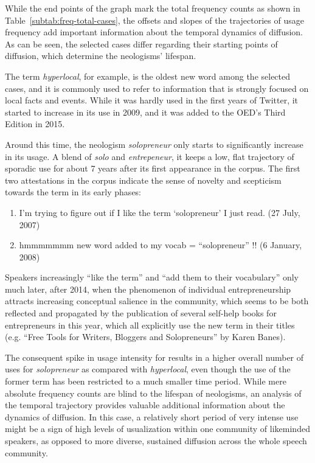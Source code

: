 \documentclass[
  a4paper,
  abstract=on,
  captions=tableabove
  ]{scrartcl}
\begin{document}
  While the end points of the graph mark the total frequency counts as shown in Table~\ref{subtab:freq-total-cases}, the offsets and slopes of the trajectories of usage frequency add important information about the temporal dynamics of diffusion. As can be seen, the selected cases differ regarding their starting points of diffusion, which determine the neologisms' lifespan.

    The term \emph{hyperlocal}, for example, is the oldest new word among the selected cases, and it is commonly used to refer to information that is strongly focused on local facts and events. While it was hardly used in the first years of Twitter, it started to increase in its use in 2009, and it was added to the OED's Third Edition in 2015.

    Around this time, the neologism \emph{solopreneur} only starts to significantly increase in its usage. A blend of \emph{solo} and \emph{entrepeneur}, it keeps a low, flat trajectory of sporadic use for about 7 years after its first appearance in the corpus. The first two attestations in the corpus indicate the sense of novelty and scepticism towards the term in its early phases:

    \renewcommand{\labelenumi}{(\arabic{enumi})}
    \begin{enumerate}
      \item I'm trying to figure out if I like the term `solopreneur' I just read. (27 July, 2007)
      \item hmmmmmmm new word added to my vocab = ``solopreneur'' !! (6 January, 2008)
    \end{enumerate}

    Speakers increasingly \enquote{like the term} and \enquote{add them to their vocabulary} only much later, after 2014, when the phenomenon of individual entrepreneurship attracts increasing conceptual salience in the community, which seems to be both reflected and propagated by the publication of several self-help books for entrepreneurs in this year, which all explicitly use the new term in their titles (e.g. \enquote{Free Tools for Writers, Bloggers and Solopreneurs} by Karen Banes).

    The consequent spike in usage intensity for results in a higher overall number of uses for \emph{solopreneur} as compared with \emph{hyperlocal}, even though the use of the former term has been restricted to a much smaller time period. While mere absolute frequency counts are blind to the lifespan of neologisms, an analysis of the temporal trajectory provides valuable additional information about the dynamics of diffusion. In this case, a relatively short period of very intense use might be a sign of high levels of usualization within one community of likeminded speakers, as opposed to more diverse, sustained diffusion across the whole speech community.
\end{document}
